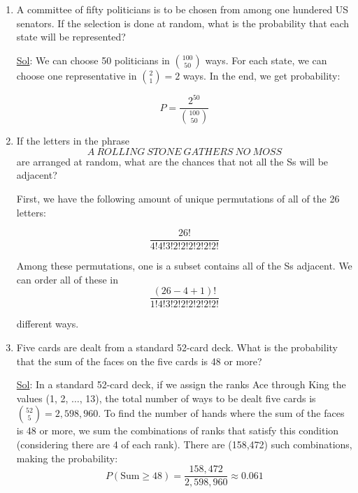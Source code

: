   \begin{enumerate}
    \item[6.] A committee of fifty politicians is to be chosen from
      among one hundered US senators. If the selection is done at
      random, what is the probability that each state will be represented?

      \underline{Sol}: We can choose 50 politicians in
      \(\binom{100}{50}\) ways. For each state, we can choose one
      representative in \(\binom{2}{1} = 2\) ways. In the end, we get
      probability:

      \[
        \boxed{P = \frac{2^{50}}{\binom{100}{50}}}
      \]

    \item[12.] If the letters in the phrase
      \[
        A \ R O L L I N G \ S T O N E \ G A T H E R S \ N O \ M O S S
      \]
      are arranged at random, what are the chances that not all the Ss
      will be adjacent?

      First, we have the following amount of unique permutations of
      all of the 26 letters:

      \[
        \frac{26!}{4!4!3!2!2!2!2!2!2!}
      \]

      Among these permutations, one is a subset contains all of the
      Ss adjacent. We can order all of these in
      \[
        \boxed{\frac{(26 - 4 + 1)!}{1!4!3!2!2!2!2!2!2!}}
      \]

      different ways.

    \item[20.] Five cards are dealt from a standard 52-card deck. What
      is the probability that the sum of the faces on the five cards is
      48 or more?

      \underline{Sol}: In a standard 52-card deck, if we assign the
      ranks Ace through King the values (1, 2, \(\dots\), 13), the total
      number of ways to be dealt five cards is \(\binom{52}{5} =
      2,598,960\). To find the number of hands where the sum of the
      faces is 48 or more, we sum the combinations of ranks that
      satisfy this condition (considering there are 4 of each rank).
      There are (158,472) such combinations, making the probability:
      $$P(\text{Sum} \geq 48) = \frac{158,472}{2,598,960} \approx
      \boxed{0.061}$$
  \end{enumerate}
